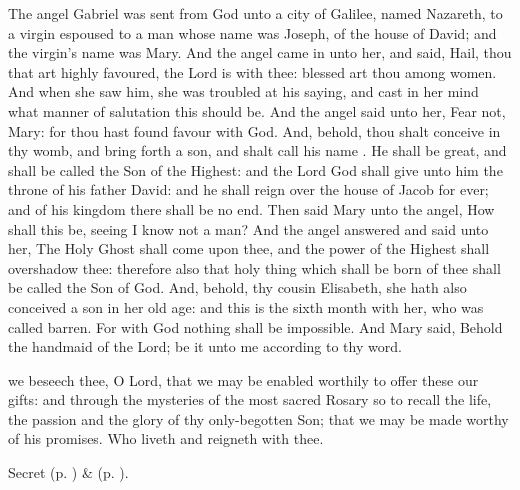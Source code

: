  The angel Gabriel was sent from God unto a city of Galilee, named Nazareth, to a virgin espoused to a man whose name was Joseph, of the house of David; and the virgin’s name was Mary. And the angel came in unto her, and said, Hail, thou that art highly favoured, the Lord is with thee: blessed art thou among women. And when she saw him, she was troubled at his saying, and cast in her mind what manner of salutation this should be. And the angel said unto her, Fear not, Mary: for thou hast found favour with God. And, behold, thou shalt conceive in thy womb, and bring forth a son, and shalt call his name . He shall be great, and shall be called the Son of the Highest: and the Lord God shall give unto him the throne of his father David: and he shall reign over the house of Jacob for ever; and of his kingdom there shall be no end. Then said Mary unto the angel, How shall this be, seeing I know not a man? And the angel answered and said unto her, The Holy Ghost shall come upon thee, and the power of the Highest shall overshadow thee: therefore also that holy thing which shall be born of thee shall be called the Son of God. And, behold, thy cousin Elisabeth, she hath also conceived a son in her old age: and this is the sixth month with her, who was called barren. For with God nothing shall be impossible. And Mary said, Behold the handmaid of the Lord; be it unto me according to thy word.


\clearpage
\secret
{} we beseech thee, O Lord, that we may be enabled worthily to offer these our gifts: and through the mysteries of the most sacred Rosary so to recall the life, the passion and the glory of thy only-begotten Son; that we may be made worthy of his promises. Who liveth and reigneth with thee.

\begin{rubric}
	 Secret  (p. \pageref{MarkRomeSecret}) \&   (p. \pageref{SergiusSecret}).
\end{rubric}


